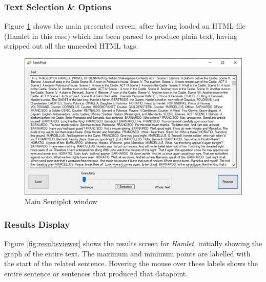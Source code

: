 \documentclass{article}
\begin{document}
    \subsubsection{Text Selection \& Options}
    Figure \ref{fig:sentiplot} shows the main presented screen, after having loaded an HTML file (Hamlet in this case) which has been parsed to produce plain text, having stripped out all the unneeded HTML tags.
        \begin{figure}[htbp]
            \includegraphics[width=1\textwidth]{Figures/Misc/sentiplot}
            \caption{Main Sentiplot window}
            \label{fig:sentiplot}
        \end{figure}
    \subsubsection{Results Display}
        Figure \ref{fig:resultsviewer} shows the results screen for \textit{Hamlet}, initially showing the graph of the entire text. The maximum and minimum points are labelled with the start of the related sentence. Hovering the mouse over these labels shows the entire sentence or sentences that produced that datapoint.
\end{document}
